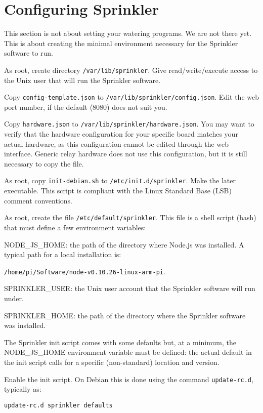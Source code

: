 \documentclass[11pt]{book}
\begin{document}
\section{Configuring Sprinkler}
This section is not about setting your watering programs. We are not there yet. This is about creating the minimal environment necessary for the Sprinkler software to run.
\begin{description}
\item As root, create directory \texttt{/var/lib/sprinkler}. Give read/write/execute access to the Unix user that will run the Sprinkler software.
\item Copy \texttt{config-template.json} to \texttt{/var/lib/sprinkler/config.json}. Edit the web port number, if the default (8080) does not suit you.
\item Copy \texttt{hardware.json} to \texttt{/var/lib/sprinkler/hardware.json}. You may want to verify that the hardware configuration for your specific board matches your actual hardware, as this configuration cannot be edited through the web interface. Generic relay hardware does not use this configuration, but it is still necessary to copy the file.
\item As root, copy \texttt{init-debian.sh} to \texttt{/etc/init.d/sprinkler}. Make the later executable. This script is compliant with the Linux Standard Base (LSB) comment conventions.
\item As root, create the file \texttt{/etc/default/sprinkler}. This file is a shell script (bash) that must define a few environment variables:
\begin{description}
\item NODE\_JS\_HOME: the path of the directory where Node.js was installed. A typical path for a local installation is:

\texttt{/home/pi/Software/node-v0.10.26-linux-arm-pi}.
\item SPRINKLER\_USER: the Unix user account that the Sprinkler software will run under.
\item SPRINKLER\_HOME: the path of the directory where the Sprinkler software was installed.
\end{description}
The Sprinkler init script comes with some defaults but, at a minimum, the NODE\_JS\_HOME environment variable must be defined: the actual default in the init script calls for a specific (non-standard) location and version.
\item Enable the init script. On Debian this is done using the command \texttt{update-rc.d}, typically as:

\indent\texttt{update-rc.d sprinkler defaults}
\linebreak
\end{description}
\end{document}
